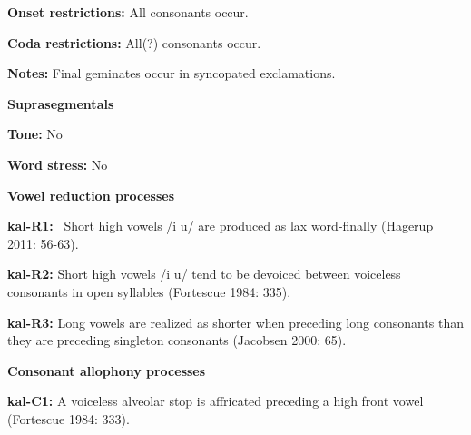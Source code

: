 \begin{styleBody}
\textbf{Onset restrictions: }All consonants occur.
\end{styleBody}

\begin{styleBody}
\textbf{Coda restrictions: }All(?) consonants occur.
\end{styleBody}

\begin{styleBody}
\textbf{Notes: }Final geminates occur in syncopated exclamations.
\end{styleBody}

\begin{styleBody}
\textbf{Suprasegmentals}
\end{styleBody}

\begin{styleBody}
\textbf{Tone:} No
\end{styleBody}

\begin{styleBody}
\textbf{Word stress:} No
\end{styleBody}

\begin{styleBody}
\textbf{Vowel reduction processes}
\end{styleBody}

\begin{styleBody}
\textbf{kal-R1: }\ Short high vowels /i u/ are produced as lax word-finally (Hagerup 2011: 56-63).
\end{styleBody}

\begin{styleBody}
\textbf{kal-R2: }Short high vowels /i u/ tend to be devoiced between voiceless consonants in open syllables (Fortescue 1984: 335).
\end{styleBody}

\begin{styleBody}
\textbf{kal-R3: }Long vowels are realized as shorter when preceding long consonants than they are preceding singleton consonants (Jacobsen 2000: 65).
\end{styleBody}

\begin{styleBody}
\textbf{Consonant allophony processes}
\end{styleBody}

\begin{styleBody}
\textbf{kal-C1: }A voiceless alveolar stop is affricated preceding a high front vowel (Fortescue 1984: 333).
\end{styleBody}

